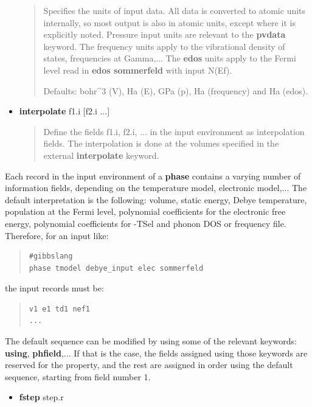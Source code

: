 \documentclass[a4paper]{article}
\begin{document}
\begin{itemize}
\begin{quote}
Specifies the units of input data. All data is converted to atomic
units internally, so most output is also in atomic units, except
where it is explicitly noted. Pressure input units are relevant to
the \textbf{pvdata} keyword. The frequency units apply to the
vibrational density of states, frequencies at Gamma,... The
\textbf{edos} units apply to the Fermi level read in \textbf{edos sommerfeld}
with input N(Ef).

Defaults: bohr\textasciicircum{}3 (V), Ha (E), GPa (p), Ha (frequency) and Ha (edos).

\end{quote}

\item \textbf{interpolate} f1.i {[}f2.i ...{]}
%
\begin{quote}

Define the fields f1.i, f2.i, ... in the input environment as
interpolation fields. The interpolation is done at the volumes
specified in the external \textbf{interpolate} keyword.

\end{quote}

\end{itemize}

Each record in the input environment of a \textbf{phase} contains a varying
number of information fields, depending on the temperature model,
electronic model,... The default interpretation is the following:
volume, static energy, Debye temperature, population at the Fermi
level, polynomial coefficients for the electronic free energy,
polynomial coefficients for -TSel and phonon DOS or frequency
file. Therefore, for an input like:
%
\begin{quote}
\begin{verbatim}
#gibbslang
phase tmodel debye_input elec sommerfeld
\end{verbatim}
\end{quote}

the input records must be:
%
\begin{quote}
\begin{verbatim}
v1 e1 td1 nef1
...
\end{verbatim}
\end{quote}

The default sequence can be modified by using some of the relevant
keywords: \textbf{using}, \textbf{phfield},... If that is the case, the fields
assigned using those keywords are reserved for the property, and the
rest are assigned in order using the default sequence, starting from
field number 1.
%
\begin{itemize}

\item \textbf{fstep} step.r

\end{itemize}
\end{document}
